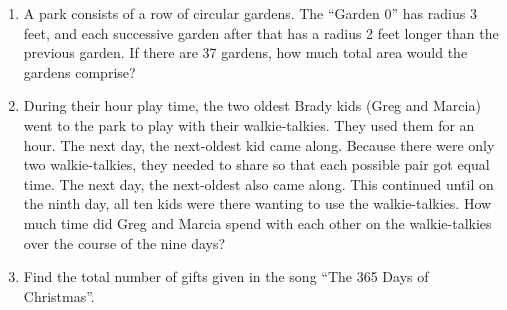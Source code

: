 \begin{problems}
\begin{enumerate}
\item A park consists of a row of circular gardens.  The ``Garden 0'' has radius 3 feet, and each successive garden after that has a radius 2 feet longer than the previous garden.  If there are 37 gardens, how much total area would the gardens comprise?


\item During their hour play time, the two oldest Brady kids (Greg and Marcia) went to the park to play with their walkie-talkies.  They used them for an hour.  The next day, the next-oldest kid came along.  Because there were only two walkie-talkies, they needed to share so that each possible pair got equal time.  The next day, the next-oldest also came along.  This continued until on the ninth day, all ten kids were there wanting to use the walkie-talkies.  How much time did Greg and Marcia spend with each other on the walkie-talkies over the course of the nine days?

\item Find the total number of gifts given in the song ``The 365 Days of Christmas''.

\end{enumerate}
\end{problems}

